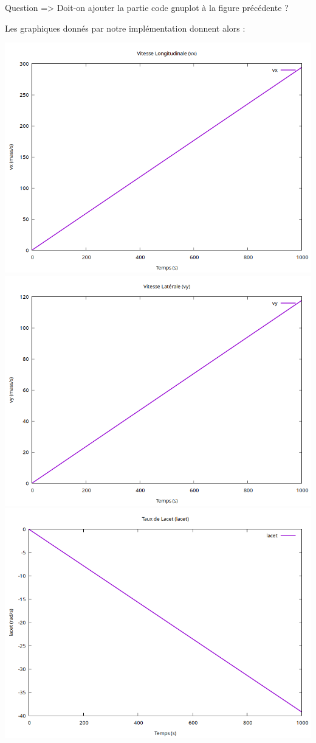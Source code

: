 {\LARGE Question => Doit-on ajouter la partie code \gls{gnuplot} à la figure précédente ?}

Les graphiques donnés par notre implémentation donnent alors :

\begin{center}
    \includegraphics[width=0.70\linewidth]{resources/Plots/Etape1/vx}
    \includegraphics[width=0.70\linewidth]{resources/Plots/Etape1/vy}
    \includegraphics[width=0.70\linewidth]{resources/Plots/Etape1/lacet}
\end{center}

